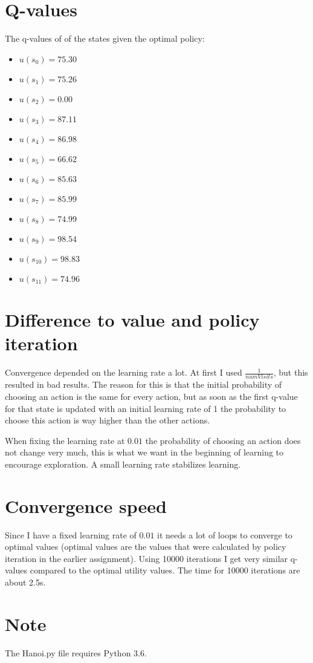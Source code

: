 \documentclass[a4paper]{article}
\begin{document}
\section{Q-values}

The q-values of of the states given the optimal policy:
\begin{multicols}{2}
\begin{itemize}
\item $u(s_0) = 75.30 $
\item $u(s_1) = 75.26 $
\item $u(s_2) = 0.00 $
\item $u(s_3) = 87.11 $
\item $u(s_4) = 86.98 $
\item $u(s_5) = 66.62 $
\item $u(s_6) = 85.63 $
\item $u(s_7) = 85.99 $
\item $u(s_8) = 74.99 $
\item $u(s_9) = 98.54 $
\item $u(s_{10}) = 98.83 $
\item $u(s_{11}) = 74.96 $
\end{itemize}
\end{multicols}

\section{Difference to value and policy iteration}
Convergence depended on the learning rate a lot. At first I used $\frac{1}{numVisits}$, but this resulted in bad results. The reason for this is that the initial probability of choosing an action is the same for every action, but as soon as the first q-value for that state is updated with an initial learning rate of 1 the probability to choose this action is way higher than the other actions. 

When fixing the learning rate at $0.01$ the probability of choosing an action does not change very much, this is what we want in the beginning of learning to encourage exploration. A small learning rate stabilizes learning.

\section{Convergence speed}
Since I have a fixed learning rate of $0.01$ it needs a lot of loops to converge to optimal values (optimal values are the values that were calculated by policy iteration in the earlier assignment). Using 10000 iterations I get very similar q-values compared to the optimal utility values. The time for 10000 iterations are about 2.5s.

\section{Note}
The Hanoi.py file requires Python 3.6.
\end{document}
